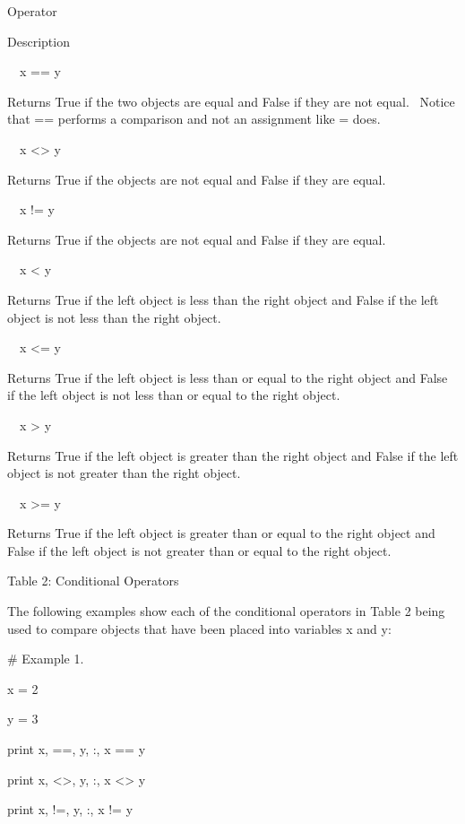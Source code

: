 \documentclass[12pt,twoside]{book}
\begin{document}
\bigskip

Operator

Description

\ \ x == y

Returns True if the two objects are equal and False if they are not
equal. \ Notice that == performs a comparison and not an assignment
like = does.

\ \ x {\textless}{\textgreater} y

Returns True if the objects are not equal and False if they are equal.

\ \ x != y

Returns True if the objects are not equal and False if they are equal.

\ \ x {\textless} y

Returns True if the left object is less than the right object and False
if the left object is not less than the right object.

\ \ x {\textless}= y

Returns True if the left object is less than or equal to the right
object and False if the left object is not less than or equal to the
right object.

\ \ x {\textgreater} y

Returns True if the left object is greater than the right object and
False if the left object is not greater than the right object.

\ \ x {\textgreater}= y

Returns True if the left object is greater than or equal to the right
object and False if the left object is not greater than or equal to the
right object.

Table 2: Conditional Operators


\bigskip

The following examples show each of the conditional operators in Table 2
being used to compare objects that have been placed into variables x
and y:


\bigskip

\# Example 1.

x = 2

y = 3 


\bigskip

print x, {\textquotedbl}=={\textquotedbl}, y,
{\textquotedbl}:{\textquotedbl}, x == y

print x, {\textquotedbl}{\textless}{\textgreater}{\textquotedbl}, y,
{\textquotedbl}:{\textquotedbl}, x {\textless}{\textgreater} y

print x, {\textquotedbl}!={\textquotedbl}, y,
{\textquotedbl}:{\textquotedbl}, x != y
\end{document}
